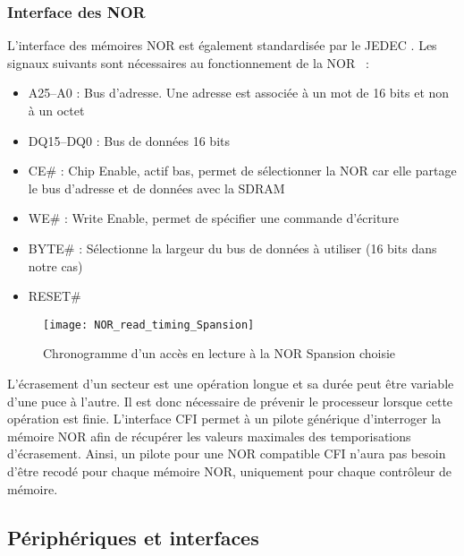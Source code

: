 \subsubsection{Interface des NOR}
L'interface des mémoires NOR est également standardisée par le JEDEC \autocite{JEDEC}.
Les signaux suivants sont nécessaires au fonctionnement de la NOR \autocite{spansion:S29GL256P}~:
\begin{itemize}
	\item A25–A0 : Bus d'adresse. Une adresse est associée à un mot de 16 bits et non à un octet
	\item DQ15–DQ0 : Bus de données 16 bits
	\item CE\# : Chip Enable, actif bas, permet de sélectionner la NOR car elle partage le bus d'adresse et de données avec la SDRAM
	\item WE\# : Write Enable, permet de spécifier une commande d'écriture
	\item BYTE\# : Sélectionne la largeur du bus de données à utiliser (16 bits dans notre cas)
	\item RESET\#
\end{itemize} 

\begin{figure}[H]
	\begin{center}
		\texttt{[image: NOR\_read\_timing\_Spansion]}
	\end{center}
	\caption{Chronogramme d'un accès en lecture à la NOR Spansion choisie \autocite{spansion:S29GL256P}}
\end{figure}
        
L'écrasement d'un secteur est une opération longue et sa durée peut être variable d'une puce à l'autre.
Il est donc nécessaire de prévenir le processeur lorsque cette opération est finie.
L'interface \gls{CFI} permet à un pilote générique d'interroger la mémoire NOR afin de récupérer les valeurs maximales des temporisations d'écrasement.
Ainsi, un pilote pour une NOR compatible \gls{CFI} n'aura pas besoin d'être recodé pour chaque mémoire NOR, uniquement pour chaque contrôleur de mémoire.

\subsection{Périphériques et interfaces}
